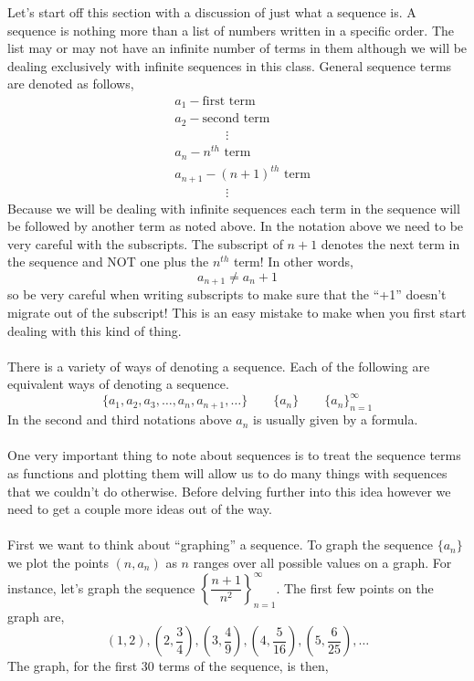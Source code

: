 \documentclass[10pt,reqno]{book}
\theoremstyle{definition}
\begin{document}
	Let's start off this section with a discussion of just what a sequence is. A sequence is nothing more than a list of numbers written in a specific order. The list may or may not have an infinite number of terms in them although we will be dealing exclusively with infinite sequences in this class. General sequence terms are denoted as follows,
	\begin{align*}
		& a_1 - \text{first term}\\
		& a_2 - \text{second term}\\
		& \qquad \qquad \vdots \\
		& a_n - n^{th} \text{ term}\\
		& a_{n+1} - (n+1)^{th} \text{ term}\\
		& \qquad \qquad \vdots 
	\end{align*}
	Because we will be dealing with infinite sequences each term in the sequence will be followed by another term as noted above. In the notation above we need to be very careful with the subscripts. The subscript of $ n+1 $ denotes the next term in the sequence and NOT one plus the $ n^{th} $ term!  In other words,
	\[ a_{n+1} \neq a_n + 1 \]
	so be very careful when writing subscripts to make sure that the ``+1'' doesn't migrate out of the subscript! This is an easy mistake to make when you first start dealing with this kind of thing.\\ \\
	There is a variety of ways of denoting a sequence. Each of the following are equivalent ways of denoting a sequence.
	\[ \{ a_1,a_2,a_3,\ldots , a_n,a_{n+1},\ldots  \} \qquad \{ a_n \} \qquad \{ a_n \}_{n=1}^{\infty} \]
	In the second and third notations above $ a_n $ is usually given by a formula. \\ \\
	One very important thing to note about sequences is to treat the sequence terms as functions and plotting them will allow us to do many things with sequences that we couldn't do otherwise. Before delving further into this idea however we need to get a couple more ideas out of the way.\\ \\
	First we want to think about ``graphing'' a sequence. To graph the sequence $ \{ a_n \} $ we plot the points $ (n,a_n) $ as $ n $ ranges over all possible values on a graph. For instance, let's graph the sequence $ \left\{ \dfrac{n+1}{n^2} \right\}_{n=1}^{\infty} $. The first few points on the graph are,
	\[ (1,2), \left(2,\frac{3}{4} \right), \left(3,\frac{4}{9}\right), \left(4,\frac{5}{16}\right), \left(5, \frac{6}{25}\right), \ldots \]
	The graph, for the first 30 terms of the sequence, is then,
	
\end{document}
